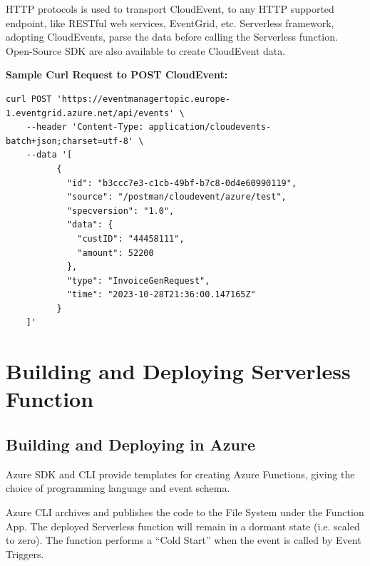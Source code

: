 \documentclass{article}
\begin{document}
\begin{flushleft}
\par
\gls{HTTP} protocols is used to transport CloudEvent, to any \gls{HTTP} supported endpoint, like RESTful web services, EventGrid, etc. Serverless framework, adopting CloudEvents,  parse the data before calling the Serverless function. Open-Source \gls{SDK} are also available to create CloudEvent data.
\pagebreak
\par
\textbf{Sample Curl Request to POST CloudEvent:}
\begin{verbatim}
curl POST 'https://eventmanagertopic.europe-1.eventgrid.azure.net/api/events' \
    --header 'Content-Type: application/cloudevents-batch+json;charset=utf-8' \
    --data '[
          {
            "id": "b3ccc7e3-c1cb-49bf-b7c8-0d4e60990119",
            "source": "/postman/cloudevent/azure/test",
            "specversion": "1.0",
            "data": {
              "custID": "44458111",
              "amount": 52200
            },
            "type": "InvoiceGenRequest",
            "time": "2023-10-28T21:36:00.147165Z"
          }
    ]'
\end{verbatim}
\end{flushleft}
\pagebreak
\section{Building and Deploying Serverless Function}

\subsection{Building and Deploying in Azure}
\begin{flushleft}
Azure \gls{SDK} and \gls{CLI} provide templates for creating Azure Functions, giving the choice of programming language and event schema.
\par
Azure \gls{CLI} archives and publishes the code to the File System under the Function App. The deployed Serverless function will remain in a dormant state (i.e. scaled to zero). The function performs a “Cold Start” when the event is called by Event Triggers.
\end{flushleft}
\end{document}
